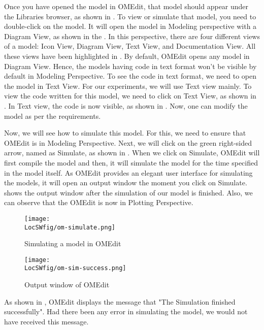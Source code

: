Once you have opened the model in OMEdit, that model should appear under the Libraries
browser, as shown in . To view or simulate that model, you need to 
double-click on the model. It will open the model in Modeling perspective with a Diagram View, as shown 
in the . In this perspective, there are four different views of 
a model: Icon View, Diagram View, Text View, and Documentation View. All these views have been highlighted in . 
By default, OMEdit opens any model in Diagram View. Hence, the models 
having code in text format won't be visible by default in Modeling 
Perspective. To see the code in text format, we need to open the model in 
Text View. For our experiments, we will use Text view mainly. To view the code written for this model, 
we need to click on Text View, as shown in . In Text view, the code is now visible, as 
shown in . Now, one can modify the model as per the requirements. 

Now, we will see how to simulate this model. For this, we need to ensure that OMEdit 
is in Modeling Perspective. Next, we will click on the green right-sided arrow, named as 
Simulate, as shown in . When we click on Simulate, OMEdit will first 
compile the model and then, it will simulate the model for the time specified in the model itself. 
As OMEdit provides an elegant user interface for simulating the models, 
it will open an output window the moment you click on Simulate. 
shows the output window after the simulation of our model is finished. Also, we can
observe that the OMEdit is now in Plotting Perspective. 


\begin{figure}
      \centering
      \texttt{[image: \\LocSWfig/om-simulate.png]}
      \caption{Simulating a model in OMEdit}
      \label{om-simulate}
\end{figure}

\begin{figure}
      \centering
      \texttt{[image: \\LocSWfig/om-sim-success.png]}
      \caption{Output window of OMEdit}
      \label{om-sim-success}
\end{figure}

As shown in , OMEdit displays the message that "The 
Simulation finished successfully". Had there been any error in simulating the model, 
we would not have received this message. 



